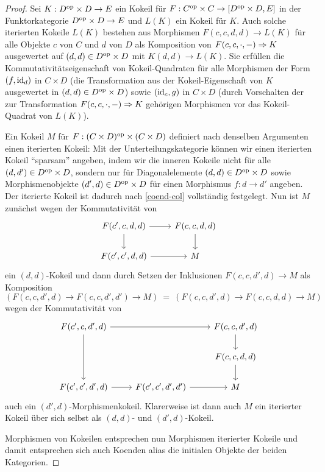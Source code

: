 \begin{proof}
  Sei $K: D^\mathrm{op} \times D \to E$ ein Kokeil für $F: C^\mathrm{op} \times C \to
  [D^\mathrm{op} \times D, E]$ in der Funktorkategorie $D^\mathrm{op} \times D \to E$
  und $L(K)$ ein Kokeil für $K$. Auch solche iterierten Kokeile $L(K)$
  bestehen aus Morphismen $F(c, c, d, d) \to L(K)$ für alle Objekte
  $c$ von $C$ und $d$ von $D$ als Komposition von $F(c, c, \cdot, -)
  \Rightarrow K$ ausgewertet auf $(d, d) \in D^\mathrm{op} \times D$ mit $K(d, d)
  \to L(K)$. Sie erfüllen die Kommutativitätseigenschaft von
  Kokeil-Quadraten für alle Morphismen der Form $(f, \operatorname{id}_d)$ in $C
  \times D$ (die Transformation aus der Kokeil-Eigenschaft von $K$
  ausgewertet in $(d, d) \in D^\mathrm{op} \times D$) sowie $(\operatorname{id}_c, g)$ in $C
  \times D$ (durch Vorschalten der zur Transformation $F(c, c, \cdot,
  -) \Rightarrow K$ gehörigen Morphismen vor das Kokeil-Quadrat von
  $L(K)$).

  Ein Kokeil $M$ für $F: (C \times D)^\mathrm{op} \times (C \times D)$
  definiert nach denselben Argumenten einen iterierten Kokeil: Mit der
  Unterteilungskategorie können wir einen iterierten Kokeil
  ``sparsam'' angeben, indem wir die inneren Kokeile nicht für alle
  $(d, d') \in D^\mathrm{op} \times D$, sondern nur für Diagonalelemente $(d,
  d) \in D^\mathrm{op} \times D$ sowie Morphismenobjekte $(d', d) \in D^\mathrm{op}
  \times D$ für einen Morphismus $f: d \to d'$ angeben. Der iterierte
  Kokeil ist dadurch nach \ref{coend-col} vollständig festgelegt. Nun
  ist $M$ zunächst wegen der Kommutativität von
  \[ \begin{tikzcd}
    F(c', c, d, d) \arrow{r} \arrow{d} & F(c, c, d, d) \arrow{d} \\
    F(c', c', d, d) \arrow{r} & M
  \end{tikzcd} \]
  ein $(d, d)$-Kokeil und dann durch Setzen der Inklusionen $F(c, c,
  d', d) \to M$ als Komposition
  \[ (F(c, c, d', d) \to F(c, c, d', d') \to M)
  \: = \: (F(c, c, d', d) \to F(c, c, d, d) \to M)
  \]
  wegen der Kommutativität von
  \[ \begin{tikzcd}
    F(c', c, d', d) \arrow{rr} \arrow{dd} & & F(c, c, d', d) \arrow{d} \\
    & & F(c, c, d, d) \arrow{d} \\
    F(c', c', d', d) \arrow{r} & F(c', c', d', d') \arrow{r} & M
  \end{tikzcd} \]
  auch ein $(d', d)$-Morphismenkokeil. Klarerweise ist dann auch $M$
  ein iterierter Kokeil über sich selbst als $(d, d)$- und $(d',
  d)$-Kokeil.

  Morphismen von Kokeilen entsprechen nun Morphismen iterierter
  Kokeile und damit entsprechen sich auch Koenden alias die initialen
  Objekte der beiden Kategorien.
\end{proof}
